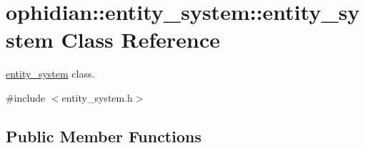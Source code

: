 \hypertarget{classophidian_1_1entity__system_1_1entity__system}{\section{ophidian\-:\-:entity\-\_\-system\-:\-:entity\-\_\-system Class Reference}
\label{classophidian_1_1entity__system_1_1entity__system}
}


\hyperlink{classophidian_1_1entity__system_1_1entity__system}{entity\-\_\-system} class.  




{\ttfamily \#include $<$entity\-\_\-system.\-h$>$}

\subsection*{Public Member Functions}
